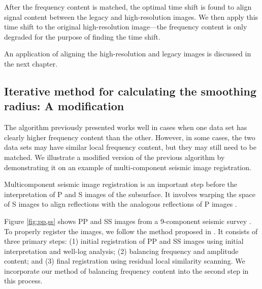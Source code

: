         After the frequency content is matched, the optimal time shift is found to align signal content between the legacy and high-resolution images. We then apply this time shift to the original high-resolution image---the frequency content is only degraded for the purpose of finding the time shift. 
        
        An application of aligning the high-resolution and legacy images is discussed in the next chapter.


\subsection{Iterative method for calculating the smoothing radius: A modification}
        The algorithm previously presented works well in cases when one data set has clearly higher frequency content than the other.
        However, in some cases, the two data sets may have similar local frequency content, but they may still need to be matched.
        We illustrate a modified version of the previous algorithm by demonstrating it on an example of multi-component seismic image registration.

        Multicomponent seismic image registration is an important step before the interpretation of P and S images of the subsurface. It involves warping the space of S images to align reflections with the analogous reflections of P images \cite[]{fomel2003,warp}.

        Figure \ref{fig:pp,ss} shows PP and SS images from a 9-component seismic survey \cite[]{attr}.
        To properly register the images, we follow the method proposed in \cite{warp}. 
        It consists of three primary steps: (1) initial registration of PP and SS images using initial interpretation and well-log analysis; (2) balancing frequency and amplitude content; and (3) final registration using residual local similarity scanning. 
        We incorporate our method of balancing frequency content into the second step in this process.

